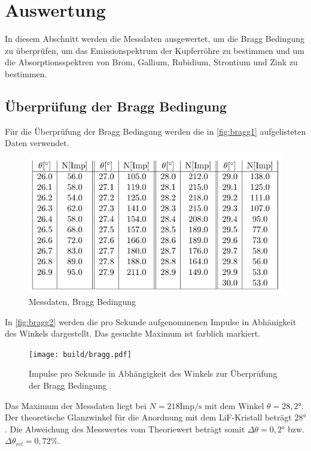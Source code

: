 \section{Auswertung}
\label{sec:Auswertung}
In diesem Abschnitt werden die Messdaten ausgewertet, um die Bragg Bedingung zu überprüfen, um das Emissionspektrum der Kupferröhre zu bestimmen und um die Absorptionsspektren von Brom, Gallium, Rubidium, Strontium und Zink zu bestimmen.
\subsection{Überprüfung der Bragg Bedingung}
\label{sec:bragg}
Für die Überprüfung der Bragg Bedingung werden die in \autoref{fig:bragg1} aufgelisteten Daten verwendet.
\begin{figure}[H]
  \centering
  \includegraphics[width=\textwidth]{daten/bragg.JPG}
  \caption{Messdaten, Bragg Bedingung \cite{sample}}
  \label{fig:bragg1}
\end{figure}
\noindent
In \autoref{fig:bragg2} werden die pro Sekunde aufgenommenen Impulse in Abhänigkeit des Winkels dargestellt. Das gesuchte Maximum ist farblich markiert.
\begin{figure}[H]
  \centering
  \texttt{[image: build/bragg.pdf]}
  \caption{Impulse pro Sekunde in Abhängigkeit des Winkels zur Überprüfung der Bragg Bedingung}
  \label{fig:bragg2}
\end{figure}
\noindent
Das Maximum der Messdaten liegt bei $N=218 \text{Imp/s}$ mit dem Winkel $\theta=28,2°$. Der theoretische Glanzwinkel für die Anordnung mit dem LiF-Kristall beträgt $28°$. Die Abweichung des Messwertes vom Theoriewert beträgt somit $\Delta \theta=0,2°$ bzw. $\Delta \theta_{rel}=0,72\%$.


